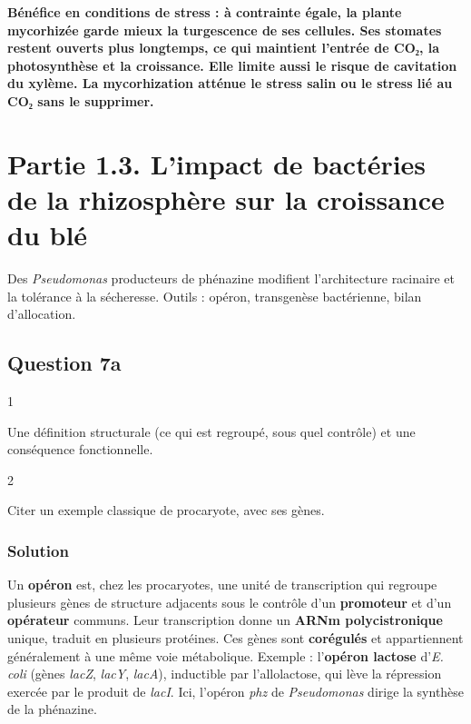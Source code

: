 \documentclass[11pt,a4paper]{article}
\begin{document}
\textbf{Bénéfice en conditions de stress : à contrainte égale, la plante mycorhizée garde mieux la turgescence de ses cellules. Ses stomates restent ouverts plus longtemps, ce qui maintient l'entrée de CO₂, la photosynthèse et la croissance. Elle limite aussi le risque de cavitation du xylème. La mycorhization atténue le stress salin ou le stress lié au CO₂ sans le supprimer.}

\hypertarget{partie-1.3.-limpact-de-bactuxe9ries-de-la-rhizosphuxe8re-sur-la-croissance-du-bluxe9}{%
\section{Partie 1.3. L'impact de bactéries de la rhizosphère sur la croissance du blé}\label{partie-1.3.-limpact-de-bactuxe9ries-de-la-rhizosphuxe8re-sur-la-croissance-du-bluxe9}}

Des \emph{Pseudomonas} producteurs de phénazine modifient l'architecture racinaire et la tolérance à la sécheresse. Outils : opéron, transgenèse bactérienne, bilan d'allocation.

\hypertarget{question-7a}{%
\subsection{Question 7a}\label{question-7a}}

\begin{indication}{1}

Une définition structurale (ce qui est regroupé, sous quel contrôle) et une conséquence fonctionnelle.

\end{indication}

\begin{indication}{2}

Citer un exemple classique de procaryote, avec ses gènes.

\end{indication}

\hypertarget{solution-15}{%
\subsubsection{Solution}\label{solution-15}}

Un \textbf{opéron} est, chez les procaryotes, une unité de transcription qui regroupe plusieurs gènes de structure adjacents sous le contrôle d'un \textbf{promoteur} et d'un \textbf{opérateur} communs. Leur transcription donne un \textbf{ARNm polycistronique} unique, traduit en plusieurs protéines. Ces gènes sont \textbf{corégulés} et appartiennent généralement à une même voie métabolique. Exemple : l'\textbf{opéron lactose} d'\emph{E. coli} (gènes \emph{lacZ}, \emph{lacY}, \emph{lacA}), inductible par l'allolactose, qui lève la répression exercée par le produit de \emph{lacI}. Ici, l'opéron \emph{phz} de \emph{Pseudomonas} dirige la synthèse de la phénazine.
\end{document}

